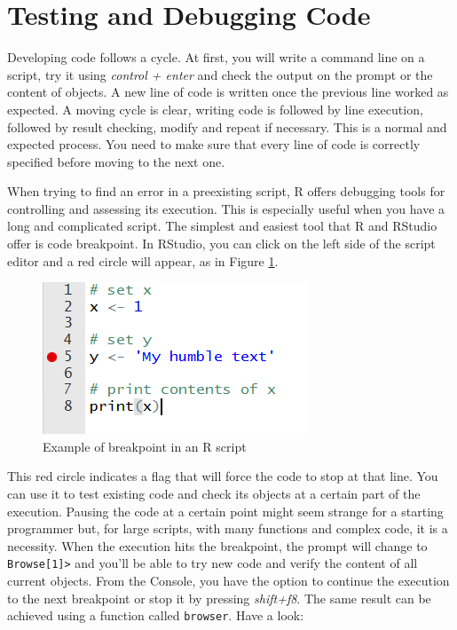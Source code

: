 \documentclass[
  12pt,
]{book}
\begin{document}
\hypertarget{testing-and-debugging-code}{%
\section{Testing and Debugging Code}\label{testing-and-debugging-code}}

Developing code follows a cycle. At first, you will write a command line on a script, try it using \emph{control + enter} and check the output on the prompt or the content of objects. A new line of code is written once the previous line worked as expected. A moving cycle is clear, writing code is followed by line execution, followed by result checking, modify and repeat if necessary. This is a normal and expected process. You need to make sure that every line of code is correctly specified before moving to the next one.

When trying to find an error in a preexisting script, R offers debugging tools for controlling and assessing its execution. This is especially useful when you have a long and complicated script. The simplest and easiest tool that R and RStudio offer is code breakpoint. In RStudio, you can click on the left side of the script editor and a red circle will appear, as in Figure \ref{fig:example-debug}.

\begin{figure}[!htbp]

{\centering \includegraphics[width=0.75\linewidth]{figs/RStudio_example_debug} 

}

\caption{Example of breakpoint in an R script}\label{fig:example-debug}
\end{figure}

This red circle indicates a flag that will force the code to stop at that line. You can use it to test existing code and check its objects at a certain part of the execution. Pausing the code at a certain point might seem strange for a starting programmer but, for large scripts, with many functions and complex code, it is a necessity. When the execution hits the breakpoint, the prompt will change to \texttt{Browse{[}1{]}\textgreater{}} and you'll be able to try new code and verify the content of all current objects. From the Console, you have the option to continue the execution to the next breakpoint or stop it by pressing \emph{shift+f8}. The same result can be achieved using a function called \texttt{browser}. Have a look:
\end{document}
